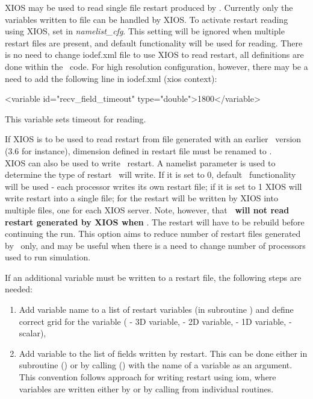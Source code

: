 \documentclass[../main/NEMO_manual]{subfiles}
\begin{document}
XIOS may be used to read single file restart produced by \NEMO. Currently only the variables written to
file  can be handled by XIOS. To activate restart reading using XIOS, set 
in \textit{namelist\_cfg}. This setting will be ignored when multiple restart files are present, and default \NEMO
functionality will be used for reading. There is no need to change iodef.xml file to use XIOS to read
restart, all definitions are done within the \NEMO\ code. For high resolution configuration, however,
there may be a need to add the following line in iodef.xml (xios context):

\begin{xmllines}
<variable id="recv_field_timeout"        type="double">1800</variable>
\end{xmllines}

This variable sets timeout for reading.

If XIOS is to be used to read restart from file generated with an earlier \NEMO\ version (3.6 for instance),
dimension  defined in restart file must be renamed to .\\

XIOS can also be used to write \NEMO\ restart. A namelist parameter  is used to determine the
type of restart \NEMO\ will write. If it is set to 0, default \NEMO\ functionality will be used - each
processor writes its own restart file; if it is set to 1 XIOS will write restart into a single file;
for  the restart will be written by XIOS into multiple files, one for each XIOS server.
Note, however, that \textbf{\NEMO\ will not read restart generated by XIOS when }. The restart will
have to be rebuild before continuing the run. This option aims to reduce number of restart files generated by \NEMO\ only,
and may be useful when there is a need to change number of processors used to run simulation.

If an additional variable must be written to a restart file, the following steps are needed:
\begin{enumerate}
\item Add variable name to a list of restart variables (in subroutine  ) and
define correct grid for the variable ( - 3D variable,  - 2D variable,  -
1D variable,  - scalar),
\item Add variable to the list of fields written by restart.  This can be done either in subroutine
 () or by calling   () with the name of a variable
as an argument. This convention follows approach for writing restart using iom, where variables are
written either by  or by calling  from individual routines.
\end{enumerate}
\end{document}
